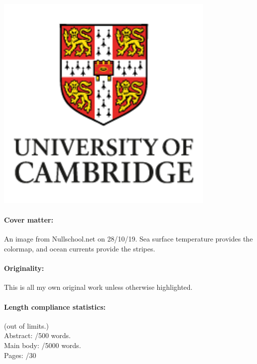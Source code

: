 \documentclass[../main.tex]{subfiles}
\begin{document}
\begin{titlepage}
\begin{center}
       \vspace{0.4cm}


       \vspace{0.3cm}


       \includegraphics[width=0.1\linewidth]{images/logos/UC.png}
       \vspace{0.8cm}
   \end{center}
\end{titlepage}

\newpage
  {
  \vspace{-50pt}
  \paragraph{Cover matter:} An image from Nullschool.net on 28/10/19. Sea surface
  temperature provides the colormap, and ocean currents provide the stripes.
  \paragraph{Originality:} This is all my own original work
                           unless otherwise highlighted.
  }

  \tableofcontents

  \paragraph{Length compliance statistics:}

  (out of limits.) \\
  Abstract:  \abwords/500 words. \\
  Main body: \words/5000 words. \\
  Pages: \pages/30
  \thispagestyle{empty}

\newpage
\end{document}
